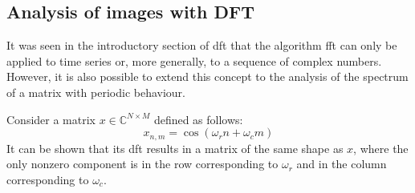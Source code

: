 
\subsection{Analysis of images with DFT}
It was seen in the introductory section of \gls{dft} that the algorithm \gls{fft} can only be applied to time series or, more generally, to a sequence of complex numbers. However, it is also possible to extend this concept to the analysis of the spectrum of a matrix with periodic behaviour.

\noindent Consider a matrix $x \in \mathbb{C}^{N \times M}$ defined as follows:
\[
x_{n,m} = \cos\left(\omega_rn+\omega_cm\right)
\]
It can be shown that its \gls{dft} results in a matrix of the same shape as $x$, where the only nonzero component is in the row corresponding to $\omega_r$ and in the column corresponding to $\omega_c$.

